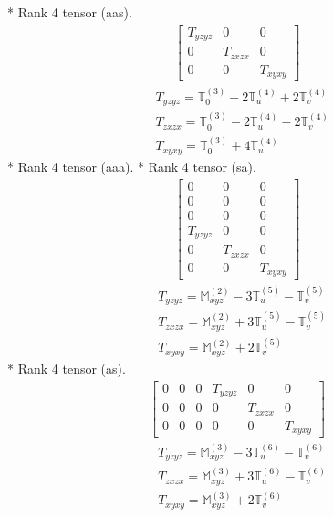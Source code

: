 \documentclass[fleqn,8pt,landscape]{jsarticle}
\begin{document}
* Rank 4 tensor (aas).
\begin{align*}
\begin{bmatrix} T_{yzyz} & 0 & 0 \\ 0 & T_{zxzx} & 0 \\ 0 & 0 & T_{xyxy} \end{bmatrix}
\end{align*}
\begin{align*}
& T_{yzyz} = \mathbb{T}_{0}^{(3)} - 2 \mathbb{T}_{u}^{(4)} + 2 \mathbb{T}_{v}^{(4)} \\
& T_{zxzx} = \mathbb{T}_{0}^{(3)} - 2 \mathbb{T}_{u}^{(4)} - 2 \mathbb{T}_{v}^{(4)} \\
& T_{xyxy} = \mathbb{T}_{0}^{(3)} + 4 \mathbb{T}_{u}^{(4)}
\end{align*}
* Rank 4 tensor (aaa).
* Rank 4 tensor (sa).
\begin{align*}
\begin{bmatrix} 0 & 0 & 0 \\ 0 & 0 & 0 \\ 0 & 0 & 0 \\ T_{yzyz} & 0 & 0 \\ 0 & T_{zxzx} & 0 \\ 0 & 0 & T_{xyxy} \end{bmatrix}
\end{align*}
\begin{align*}
& T_{yzyz} = \mathbb{M}_{xyz}^{(2)} - 3 \mathbb{T}_{u}^{(5)} - \mathbb{T}_{v}^{(5)} \\
& T_{zxzx} = \mathbb{M}_{xyz}^{(2)} + 3 \mathbb{T}_{u}^{(5)} - \mathbb{T}_{v}^{(5)} \\
& T_{xyxy} = \mathbb{M}_{xyz}^{(2)} + 2 \mathbb{T}_{v}^{(5)}
\end{align*}
* Rank 4 tensor (as).
\begin{align*}
\begin{bmatrix} 0 & 0 & 0 & T_{yzyz} & 0 & 0 \\ 0 & 0 & 0 & 0 & T_{zxzx} & 0 \\ 0 & 0 & 0 & 0 & 0 & T_{xyxy} \end{bmatrix}
\end{align*}
\begin{align*}
& T_{yzyz} = \mathbb{M}_{xyz}^{(3)} - 3 \mathbb{T}_{u}^{(6)} - \mathbb{T}_{v}^{(6)} \\
& T_{zxzx} = \mathbb{M}_{xyz}^{(3)} + 3 \mathbb{T}_{u}^{(6)} - \mathbb{T}_{v}^{(6)} \\
& T_{xyxy} = \mathbb{M}_{xyz}^{(3)} + 2 \mathbb{T}_{v}^{(6)}
\end{align*}
\end{document}
